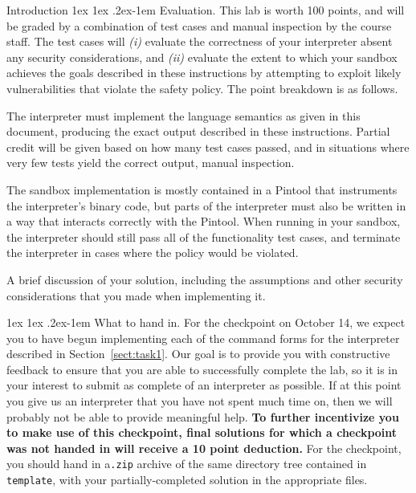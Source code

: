 \documentclass[11pt]{article}
\makeatletter
\renewcommand{\paragraph}{%
  \@startsection{paragraph}{4}%
  {\z@}{1ex \@plus 1ex \@minus .2ex}{-1em}%
  {\normalfont\normalsize\bfseries}
}
\makeatother
\begin{document}
\begin{problem}{Introduction}
  \paragraph{Evaluation.}
    This lab is worth 100 points, and will be graded by a combination of test cases and manual inspection by the course staff. The test cases will \emph{(i)} evaluate the correctness of your interpreter absent any security considerations, and \emph{(ii)} evaluate the extent to which your sandbox achieves the goals described in these instructions by attempting to exploit likely vulnerabilities that violate the safety policy. The point breakdown is as follows.
    \begin{description}[noitemsep,topsep=0pt]
      \item[Correct interpreter (40 points).] The interpreter must implement the language semantics as given in this document, producing the exact output described in these instructions. Partial credit will be given based on how many test cases passed, and in situations where very few tests yield the correct output, manual inspection.
      \item[Correct sandbox implementation (55 points, 10 possible extra credit).] The sandbox implementation is mostly contained in a Pintool that instruments the interpreter's binary code, but parts of the interpreter must also be written in a way that interacts correctly with the Pintool. When running in your sandbox, the interpreter should still pass all of the functionality test cases, and terminate the interpreter in cases where the policy would be violated.
      \item[Discussion (5 points)] A brief discussion of your solution, including the assumptions and other security considerations that you made when implementing it.
    \end{description}
\end{problem}

\paragraph{What to hand in.} 
For the checkpoint on October 14, we expect you to have begun implementing each of the command forms for the interpreter described in Section~\ref{sect:task1}.
Our goal is to provide you with constructive feedback to ensure that you are able to successfully complete the lab, so it is in your interest to submit as complete of an interpreter as possible.
If at this point you give us an interpreter that you have not spent much time on, then we will probably not be able to provide meaningful help.
\textbf{To further incentivize you to make use of this checkpoint, final solutions for which a checkpoint was not handed in will receive a 10 point deduction.}
For the checkpoint, you should hand in a\verb'.zip' archive of the same directory tree contained in \verb'template', with your partially-completed solution in the appropriate files.
\end{document}
